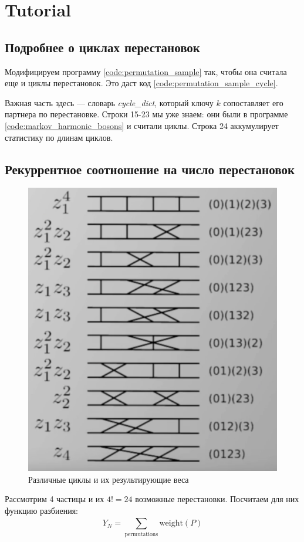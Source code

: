 \section{Tutorial}
\subsection{Подробнее о циклах перестановок}
Модифицируем программу \ref{code:permutation_sample} так, чтобы она считала еще и циклы перестановок.
Это даст код \ref{code:permutation_sample_cycle}.


Важная часть здесь --- словарь \textit{cycle\_dict}, который ключу $k$ сопоставляет его партнера по перестановке.
Строки 15-23 мы уже знаем: они были в программе \ref{code:markov_harmonic_bosons} и считали циклы.
Строка 24 аккумулирует статистику по длинам циклов.

\subsection{Рекуррентное соотношение на число перестановок}
\begin{figure}
    \includegraphics[width=\linewidth]{fig/permutations-weights}
    \caption{Различные циклы и их результирующие веса}
    \label{fig:permutations-weights}
\end{figure}
Рассмотрим 4 частицы и их $4!=24$ возможные перестановки.
Посчитаем для них функцию разбиения:
\begin{equation}
    \label{eq:Y_N-definition}
    Y_N = \sum\limits_{\text{permutations}}^{} \text{weight} (P)
\end{equation}

